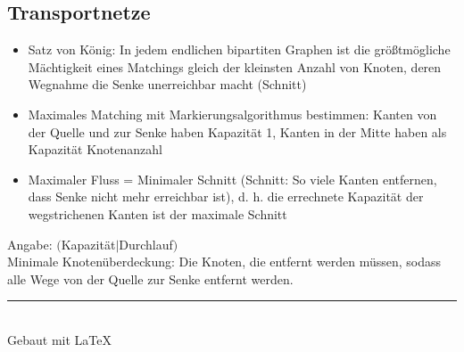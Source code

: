 \documentclass[12pt,landscape]{article}
\begin{document}
\begin{multicols}{3}
\subsection{Transportnetze}
\begin{itemize}
\item Satz von König: In jedem endlichen bipartiten Graphen ist die größtmögliche Mächtigkeit eines Matchings gleich der kleinsten Anzahl von Knoten, deren Wegnahme die Senke unerreichbar macht (Schnitt)
\item Maximales Matching mit Markierungsalgorithmus bestimmen: Kanten von der Quelle und zur Senke haben Kapazität 1, Kanten in der Mitte haben als Kapazität Knotenanzahl
\item Maximaler Fluss = Minimaler Schnitt (Schnitt: So viele Kanten entfernen, dass Senke nicht mehr erreichbar ist), d. h. die errechnete Kapazität der wegstrichenen Kanten ist der maximale Schnitt
\end{itemize}
Angabe: $($Kapazität$|$Durchlauf$)$ \\
Minimale Knotenüberdeckung: Die Knoten, die entfernt werden müssen, sodass alle Wege von der Quelle zur Senke entfernt werden.
\\
\rule{0.3\linewidth}{0.25pt}
\\
\scriptsize
Gebaut mit \LaTeX
\end{multicols}
\end{document}
